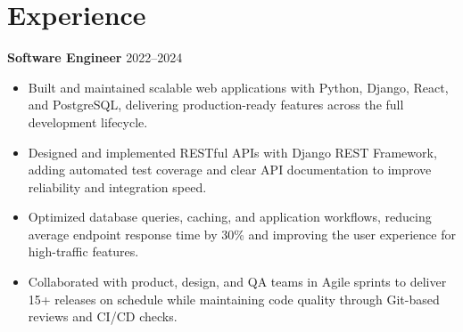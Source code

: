 \section*{Experience}

\textbf{Software Engineer} \hfill 2022--2024

\begin{itemize}
    \item Built and maintained scalable web applications with Python, Django, React, and PostgreSQL, delivering production-ready features across the full development lifecycle.
    \item Designed and implemented RESTful APIs with Django REST Framework, adding automated test coverage and clear API documentation to improve reliability and integration speed.
    \item Optimized database queries, caching, and application workflows, reducing average endpoint response time by 30\% and improving the user experience for high-traffic features.
    \item Collaborated with product, design, and QA teams in Agile sprints to deliver 15+ releases on schedule while maintaining code quality through Git-based reviews and CI/CD checks.
\end{itemize}